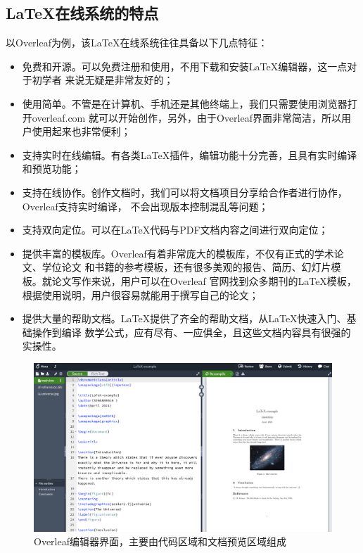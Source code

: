 \subsection{\LaTeX 在线系统的特点}
以Overleaf为例，该LaTeX在线系统往往具备以下几点特征：
\begin{itemize}
    \item 免费和开源。可以免费注册和使用，不用下载和安装LaTeX编辑器，这一点对于初学者
          来说无疑是非常友好的；
    \item 使用简单。不管是在计算机、手机还是其他终端上，我们只需要使用浏览器打开overleaf.com
          就可以开始创作，另外，由于Overleaf界面非常简洁，所以用户使用起来也非常便利；
    \item 支持实时在线编辑。有各类LaTeX插件，编辑功能十分完善，且具有实时编译和预览功能；
    \item 支持在线协作。创作文档时，我们可以将文档项目分享给合作者进行协作，Overleaf支持实时编译，
          不会出现版本控制混乱等问题；
    \item 支持双向定位。可以在LaTeX代码与PDF文档内容之间进行双向定位；
    \item 提供丰富的模板库。Overleaf有着非常庞大的模板库，不仅有正式的学术论文、学位论文
          和书籍的参考模板，还有很多美观的报告、简历、幻灯片模板。就论文写作来说，用户可以在Overleaf
          官网找到众多期刊的LaTeX模板，根据使用说明，用户很容易就能用于撰写自己的论文；
    \item 提供大量的帮助文档。LaTeX提供了齐全的帮助文档，从LaTeX快速入门、基础操作到编译
          数学公式，应有尽有、一应俱全，且这些文档内容具有很强的实操性。
\end{itemize}

\begin{figure}
    \centering
    \includegraphics[width=\textwidth]{images/overleaf_example.png}
    \caption{Overleaf编辑器界面，主要由代码区域和文档预览区域组成}
\end{figure}

